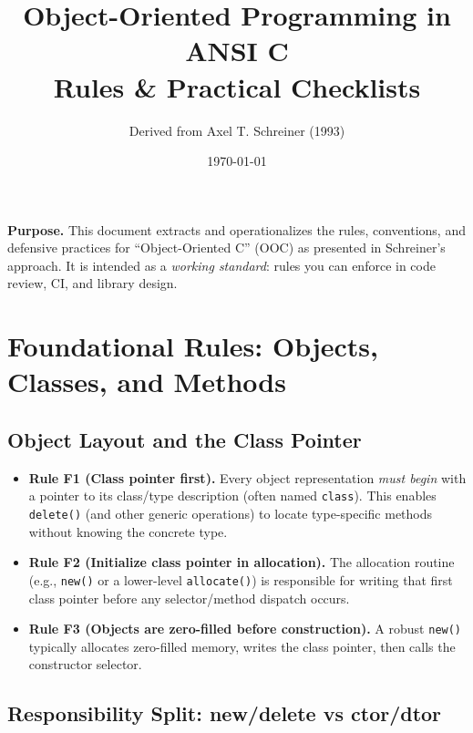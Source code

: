 \documentclass[11pt]{article}
\title{Object-Oriented Programming in ANSI C\\Rules \& Practical Checklists}
\author{Derived from Axel T. Schreiner (1993)}
\date{\today}
\begin{document}
\maketitle

\begin{center}
\textbf{Purpose.} This document extracts and operationalizes the rules, conventions, and defensive practices for ``Object-Oriented C'' (OOC) as presented in Schreiner's approach. It is intended as a \emph{working standard}: rules you can enforce in code review, CI, and library design.
\end{center}

\tableofcontents
\newpage

\section{Foundational Rules: Objects, Classes, and Methods}

\subsection{Object Layout and the Class Pointer}

\begin{itemize}
  \item \textbf{Rule F1 (Class pointer first).} Every object representation \emph{must begin} with a pointer to its class/type description (often named \texttt{class}). This enables \texttt{delete()} (and other generic operations) to locate type-specific methods without knowing the concrete type.
  \item \textbf{Rule F2 (Initialize class pointer in allocation).} The allocation routine (e.g., \texttt{new()} or a lower-level \texttt{allocate()}) is responsible for writing that first class pointer before any selector/method dispatch occurs.
  \item \textbf{Rule F3 (Objects are zero-filled before construction).} A robust \texttt{new()} typically allocates zero-filled memory, writes the class pointer, then calls the constructor selector.
\end{itemize}

\subsection{Responsibility Split: new/delete vs ctor/dtor}
\end{document}
